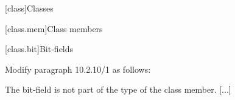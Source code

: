 \setcounter{chapter}{9}
[class]{Classes}

\setcounter{section}{1}
[class.mem]{Class members}

\setcounter{subsection}{9}
[class.bit]{Bit-fields}

Modify paragraph 10.2.10/1 as follows:
\begin{std.txt}
    \resetalinea[0]
    \alinea
    [...] The bit-field  is not part of 
    the type of the class member. [...]
\end{std.txt}
